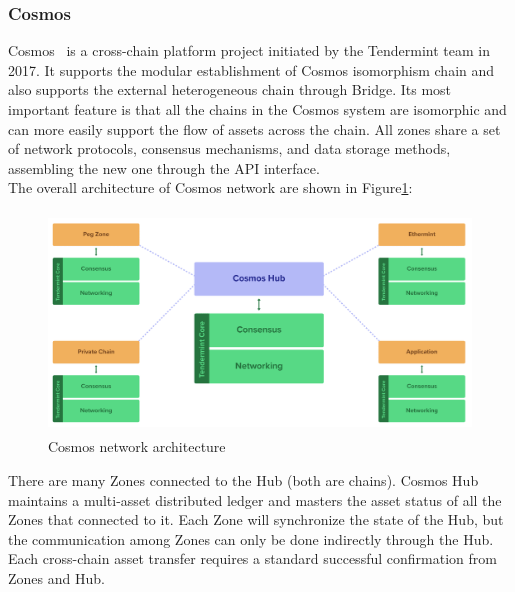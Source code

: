 \subsubsection{Cosmos}
\noindent Cosmos~\cite{cosmos} is a cross-chain platform project initiated by the Tendermint team in 2017. It supports the modular establishment of Cosmos isomorphism chain and also supports the external heterogeneous chain through Bridge. Its most important feature is that all the chains in the Cosmos system are isomorphic and can more easily support the flow of assets across the chain. All zones share a set of network protocols, consensus mechanisms, and data storage methods, assembling the new one through the API interface.\\

\noindent The overall architecture of Cosmos network are shown in Figure\ref{fig:cosmos}:

        \begin{figure}[H]
        \includegraphics[width=1\textwidth, height=2.3in]{./figures/cosmos.png}
        \centering
        \caption{Cosmos network architecture\protect\footnotemark[1]}
        \centering
        \label{fig:cosmos}
        \end{figure}
        
\noindent There are many Zones connected to the Hub (both are chains). Cosmos Hub maintains a multi-asset distributed ledger and masters the asset status of all the Zones that connected to it. Each Zone will synchronize the state of the Hub, but the communication among Zones can only be done indirectly through the Hub. Each cross-chain asset transfer requires a standard successful confirmation from Zones and Hub. \\

